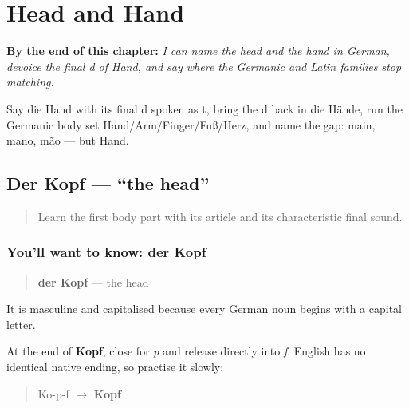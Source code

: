 
\chapter{Head and Hand}
\label{ch:ge-head-and-hand}

\begin{chapteropening}
\textbf{By the end of this chapter:} \emph{I can name the head and the hand in German, devoice the final d of Hand, and say where the Germanic and Latin families stop matching.}

Say die Hand with its final d spoken as t, bring the d back in die Hände, run the Germanic body set Hand/Arm/Finger/Fuß/Herz, and name the gap: main, mano, mão — but Hand.
\end{chapteropening}

\section[der Kopf]{Der Kopf — “the head”}

\label{lesson:GE-C17-kopf}



\begin{quote}
Learn the first body part with its article and its characteristic final sound.
\end{quote}

\subsection*{You'll want to know: der Kopf}
\begin{quote}
\textbf{der Kopf} — the head
\end{quote}

It is masculine and capitalised because every German noun begins with a capital letter.

\begin{sounds}
At the end of \textbf{Kopf}, close for \emph{p} and release directly into \emph{f}. English has no identical native ending, so practise it slowly:

\begin{quote}
Ko-p-f $\to$ \textbf{Kopf}
\end{quote}
\end{sounds}

